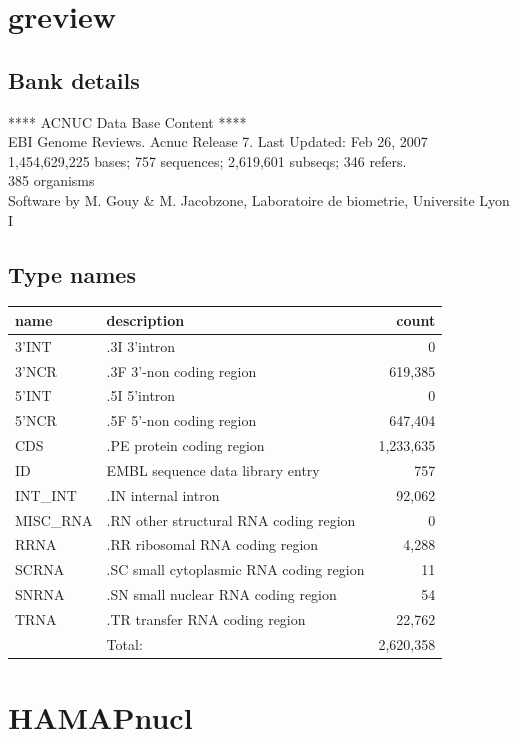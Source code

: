 \documentclass{article}
\begin{document}
\begin{Schunk}
\section{ greview }
\subsection{Bank details}
             ****     ACNUC Data Base Content      ****                         \\
        EBI Genome Reviews. Acnuc Release 7. Last Updated: Feb 26, 2007\\
1,454,629,225 bases; 757 sequences; 2,619,601 subseqs; 346 refers.\\
385 organisms\\
Software by M. Gouy \& M. Jacobzone, Laboratoire de biometrie, Universite Lyon I 

\subsection{Type names}
\noindent\begin{tabular}{llr}
\hline \hline
name & description & count \\
\hline
3'INT  &  .3I 3'intron  &  0 \\
3'NCR  &  .3F  3'-non coding region  &  619,385 \\
5'INT  &  .5I 5'intron  &  0 \\
5'NCR  &  .5F  5'-non coding region  &  647,404 \\
CDS  &  .PE protein coding region  &  1,233,635 \\
ID  &  EMBL sequence data library entry  &  757 \\
INT\_INT  &  .IN  internal intron  &  92,062 \\
MISC\_RNA  &  .RN other structural RNA coding region  &  0 \\
RRNA  &  .RR ribosomal RNA coding region  &  4,288 \\
SCRNA  &  .SC small cytoplasmic RNA coding region  &  11 \\
SNRNA  &  .SN small nuclear RNA coding region  &  54 \\
TRNA  &  .TR transfer RNA coding region  &  22,762 \\
\hline
 & Total: & 2,620,358 \\
\hline \hline
\end{tabular}

\section{ HAMAPnucl }

\end{Schunk}
\end{document}
